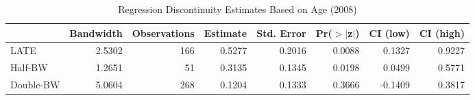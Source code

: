 \begin{table}[ht]
\centering
\begin{tabular}{lrrrrrrr}
  \hline
 & Bandwidth & Observations & Estimate & Std. Error & Pr($>$$|$z$|$) & CI (low) & CI (high) \\ 
  \hline
LATE & 2.5302 & 166 & 0.5277 & 0.2016 & 0.0088 & 0.1327 & 0.9227 \\ 
  Half-BW & 1.2651 & 51 & 0.3135 & 0.1345 & 0.0198 & 0.0499 & 0.5771 \\ 
  Double-BW & 5.0604 & 268 & 0.1204 & 0.1333 & 0.3666 & -0.1409 & 0.3817 \\ 
   \hline
\end{tabular}
\caption{Regression Discontinuity Estimates Based on Age (2008)} 
\label{tab:rd2008y}
\end{table}
